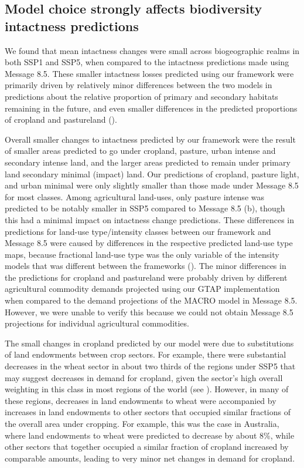 \documentclass[titlesmallcaps,copyrightpage]{uomthesis}\usepackage[]{graphicx}\usepackage[]{color}
\begin{document}
\subsection{Model choice strongly affects biodiversity intactness predictions}
We found that mean intactness changes were small across biogeographic realms in both SSP1 and SSP5, when compared to the intactness predictions made using Message 8.5. These smaller intactness losses predicted using our framework were primarily driven by relatively minor differences between the two models in predictions about the relative proportion of primary and secondary habitats remaining in the future, and even smaller differences in the predicted proportions of cropland and pastureland ().

Overall smaller changes to intactness predicted by our framework were the result of smaller areas predicted to go under cropland, pasture, urban intense and secondary intense land, and the larger areas predicted to remain under primary land secondary minimal (impact) land. Our predictions of cropland, pasture light, and urban minimal were only slightly smaller than those made under Message 8.5 for most classes. Among agricultural land-uses, only pasture intense was predicted to be notably smaller in SSP5 compared to Message 8.5 (b), though this had a minimal impact on intactness change predictions. These differences in predictions for land-use type/intensity classes between our framework and Message 8.5 were caused by differences in the respective predicted land-use type maps, because fractional land-use type was the only variable of the intensity models that was different between the frameworks (). The minor differences in the predictions for cropland and pastureland were probably driven by different agricultural commodity demands projected using our GTAP implementation when compared to the demand projections of the MACRO model in Message 8.5. However, we were unable to verify this because we could not obtain Message 8.5 projections for individual agricultural commodities.

The small changes in cropland predicted by our model were due to substitutions of land endowments between crop sectors. For example, there were substantial decreases in the wheat sector in about two thirds of the regions under SSP5 that may suggest decreases in demand for cropland, given the sector's high overall weighting in this class in most regions of the world (see ). However, in many of these regions, decreases in land endowments to wheat were accompanied by increases in land endowments to other sectors that occupied similar fractions of the overall area under cropping. For example, this was the case in Australia, where land endowments to wheat were predicted to decrease by about 8\%, while other sectors that together occupied a similar fraction of cropland increased by comparable amounts, leading to very minor net changes in demand for cropland.
\end{document}
